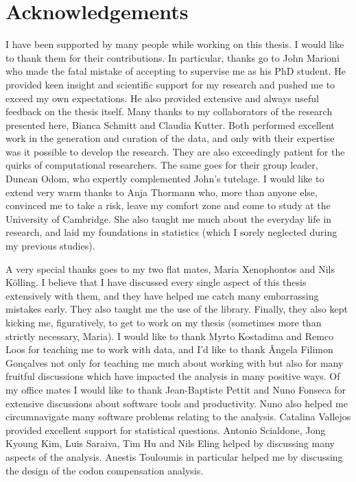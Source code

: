 \clearpage \chapter*{Acknowledgements}

I have been supported by many people while working on this thesis. I would like
to thank them for their contributions. In particular, thanks go to John Marioni
who made the fatal mistake of accepting to supervise me as his PhD student. He
provided keen insight and scientific support for my research and pushed me to
exceed my own expectations. He also provided extensive and always useful
feedback on the thesis itself. Many thanks to my collaborators of the research
presented here, Bianca Schmitt and Claudia Kutter. Both performed excellent work
in the generation and curation of the data, and only with their expertise was it
possible to develop the research. They are also exceedingly patient for the
quirks of computational researchers. The same goes for their group leader,
Duncan Odom, who expertly complemented John’s tutelage. I would like to extend
very warm thanks to Anja Thormann who, more than anyone else, convinced me to
take a risk, leave my comfort zone and come to study at the University of
Cambridge. She also taught me much about the everyday life in research, and laid
my foundations in statistics (which I sorely neglected during my previous
studies).

A very special thanks goes to my two flat mates, Maria Xenophontos and Nils
Kölling. I believe that I have discussed every single aspect of this thesis
extensively with them, and they have helped me catch many embarrassing mistakes
early. They also taught me the use of the  library. Finally, they
also kept kicking me, figuratively, to get to work on my thesis (sometimes more
than strictly necessary, Maria). I would like to thank Myrto Kostadima and Remco
Loos for teaching me to work with  data, and I’d like to thank
Ângela Filimon Gonçalves not only for teaching me much about working with
 but also for many fruitful discussions which have impacted the
analysis in many positive ways. Of my office mates I would like to thank
Jean-Baptiste Pettit and Nuno Fonseca for extensive discussions about software
tools and productivity. Nuno also helped me circumnavigate many software
problems relating to the  analysis. Catalina Vallejos provided
excellent support for statistical questions. Antonio Scialdone, Jong Kyoung Kim,
Luis Saraiva, Tim Hu and Nils Eling helped by discussing many aspects of the
analysis. Anestis Touloumis in particular helped me by discussing the design of
the codon compensation analysis.

